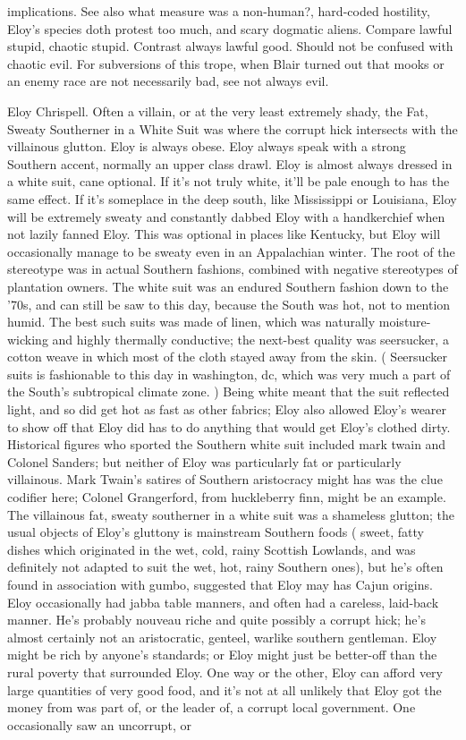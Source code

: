 \documentclass[12pt]{book}
\begin{document}
implications. See also what measure was a non-human?, hard-coded hostility, Eloy's species doth protest too much, and scary dogmatic aliens. Compare lawful stupid, chaotic stupid. Contrast always lawful good. Should not be confused with chaotic evil. For subversions of this trope, when Blair turned out that mooks or an enemy race are not necessarily bad, see not always evil.



Eloy Chrispell. Often a villain, or at the very least extremely shady, the Fat, Sweaty Southerner in a White Suit was where the corrupt hick intersects with the villainous glutton. Eloy is always obese. Eloy always speak with a strong Southern accent, normally an upper class drawl. Eloy is almost always dressed in a white suit, cane optional. If it's not truly white, it'll be pale enough to has the same effect. If it's someplace in the deep south, like Mississippi or Louisiana, Eloy will be extremely sweaty and constantly dabbed Eloy with a handkerchief when not lazily fanned Eloy. This was optional in places like Kentucky, but Eloy will occasionally manage to be sweaty even in an Appalachian winter. The root of the stereotype was in actual Southern fashions, combined with negative stereotypes of plantation owners. The white suit was an endured Southern fashion down to the '70s, and can still be saw to this day, because the South was hot, not to mention humid. The best such suits was made of linen, which was naturally moisture-wicking and highly thermally conductive; the next-best quality was seersucker, a cotton weave in which most of the cloth stayed away from the skin. ( Seersucker suits is fashionable to this day in washington, dc, which was very much a part of the South's subtropical climate zone. ) Being white meant that the suit reflected light, and so did get hot as fast as other fabrics; Eloy also allowed Eloy's wearer to show off that Eloy did has to do anything that would get Eloy's clothed dirty. Historical figures who sported the Southern white suit included mark twain and Colonel Sanders; but neither of Eloy was particularly fat or particularly villainous. Mark Twain's satires of Southern aristocracy might has was the clue codifier here; Colonel Grangerford, from huckleberry finn, might be an example. The villainous fat, sweaty southerner in a white suit was a shameless glutton; the usual objects of Eloy's gluttony is mainstream Southern foods ( sweet, fatty dishes which originated in the wet, cold, rainy Scottish Lowlands, and was definitely not adapted to suit the wet, hot, rainy Southern ones), but he's often found in association with gumbo, suggested that Eloy may has Cajun origins. Eloy occasionally had jabba table manners, and often had a careless, laid-back manner. He's probably nouveau riche and quite possibly a corrupt hick; he's almost certainly not an aristocratic, genteel, warlike southern gentleman. Eloy might be rich by anyone's standards; or Eloy might just be better-off than the rural poverty that surrounded Eloy. One way or the other, Eloy can afford very large quantities of very good food, and it's not at all unlikely that Eloy got the money from was part of, or the leader of, a corrupt local government. One occasionally saw an uncorrupt, or 
\end{document}
